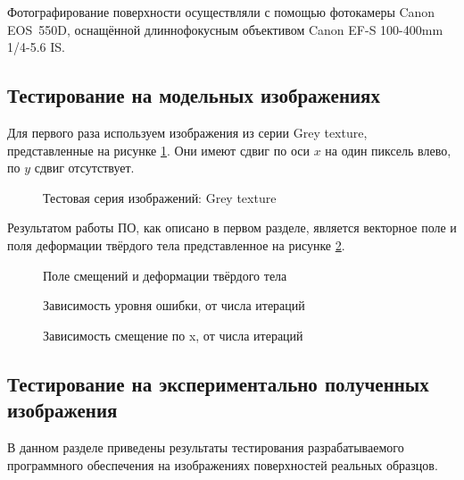 Фотографирование поверхности осуществляли с помощью фотокамеры Canon EOS 550D, оснащённой длиннофокусным объективом Canon EF-S 100-400mm 1/4-5.6 IS.

\subsection{Тестирование на модельных изображениях}

Для первого раза используем изображения из серии Grey texture, представленные на рисунке \ref{pic:gray_set}. Они имеют сдвиг по оси $x$ на один пиксель влево, по $y$ сдвиг отсутствует.

\begin{figure}[ht]
\caption{Тестовая серия изображений: Grey texture}
\label{pic:gray_set}
\end{figure}

Результатом работы ПО, как описано в первом разделе, является векторное поле и поля деформации твёрдого тела представленное на рисунке \ref{pic:gray_set_out}.

\begin{figure}[ht]
\caption{Поле смещений и деформации твёрдого тела}
\label{pic:gray_set_out}
\end{figure}

\begin{figure}[ht]
\caption{Зависимость уровня ошибки, от числа итераций}
\label{pic:gray_set_func_iteration}
\end{figure}

\begin{figure}[ht]
\caption{Зависимость смещение по x, от числа итераций}
\label{pic:gray_set_func_iter_vector}
\end{figure}

\subsection{Тестирование на экспериментально полученных изображения}
В данном разделе приведены результаты тестирования разрабатываемого программного обеспечения на изображениях поверхностей реальных образцов. 